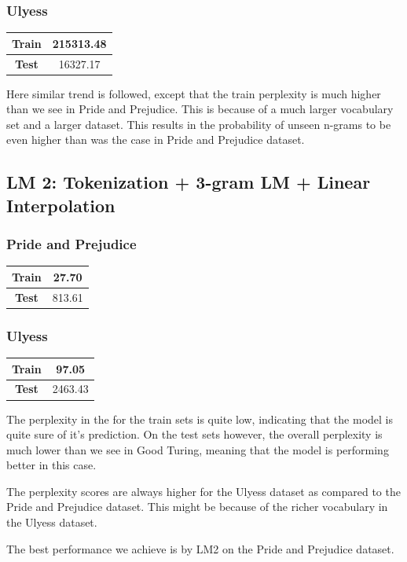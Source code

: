 \documentclass[a4paper,9pt]{report}
\begin{document}
\subsubsection*{Ulyess}
\begin{table}[H]
    \centering
    \begin{tabular}{|c|c|}
        \hline
        \textbf{Train} & {215313.48} \\
        \hline
        \textbf{Test} & {16327.17} \\
        \hline
    \end{tabular}
\end{table}
Here similar trend is followed, except that the train perplexity is much higher than we see in Pride and Prejudice. This is because of a much larger vocabulary set and a larger dataset. This results in the probability of unseen n-grams to be even higher than was the case in Pride and Prejudice dataset.

\subsection*{LM 2: Tokenization + 3-gram LM + Linear Interpolation}
\subsubsection*{Pride and Prejudice}
\begin{table}[H]
    \centering
    \begin{tabular}{|c|c|}
        \hline
        \textbf{Train} & {27.70} \\
        \hline
        \textbf{Test} & {813.61} \\
        \hline
    \end{tabular}
\end{table}


\subsubsection*{Ulyess}
\begin{table}[H]
    \centering
    \begin{tabular}{|c|c|}
        \hline
        \textbf{Train} & {97.05} \\
        \hline
        \textbf{Test} & {2463.43} \\
        \hline
    \end{tabular}
\end{table}

The perplexity in the for the train sets is quite low, indicating that the model is quite sure of it's prediction. 
On the test sets however, the overall perplexity is much lower than we see in Good Turing, meaning that the model is performing better in this case.

The perplexity scores are always higher for the Ulyess dataset as compared to the Pride and Prejudice dataset. This might be because of the richer vocabulary in the Ulyess dataset.

The best performance we achieve is by LM2 on the Pride and Prejudice dataset.
\end{document}

